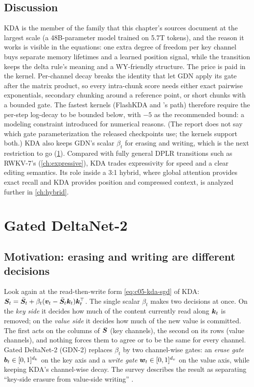 \subsection{Discussion}

KDA is the member of the family that this chapter's sources document at the largest scale (a
48B-parameter model trained on 5.7T tokens), and the reason it works is visible in the equations:
one extra degree of freedom per key channel buys separate
memory lifetimes and a learned position signal, while the transition keeps the delta rule's
meaning and a WY-friendly structure. The price is paid in the kernel. Per-channel decay breaks
the identity that let GDN apply its gate after the matrix product, so every intra-chunk score
needs either exact pairwise exponentials, secondary chunking around a reference point, or short
chunks with a bounded gate. The fastest kernels (FlashKDA and \fla{}'s  path)
therefore require the per-step log-decay to be bounded below, with $-5$ as the recommended bound:
a modeling constraint introduced for numerical reasons. (The report does not say which gate
parameterization the released checkpoints use; the kernels support both.) KDA also keeps GDN's scalar $\beta_t$
for erasing and writing, which is the next restriction to go (\cref{sec:c05-gdn2}). Compared with
fully general DPLR transitions such as RWKV-7's (\cref{ch:expressive}), KDA trades expressivity
for speed and a clear editing semantics. Its role inside a 3:1 hybrid, where global attention
provides exact recall and KDA provides position and compressed context, is analyzed further in
\cref{ch:hybrid}.

\section{Gated DeltaNet-2}\label{sec:c05-gdn2}

\subsection{Motivation: erasing and writing are different decisions}

Look again at the read-then-write form \cref{eq:c05-kda-sgd} of KDA:
$\bm{S}_t = \bar{\bm{S}}_t + \beta_t(\bm{v}_t - \bar{\bm{S}}_t\bm{k}_t)\bm{k}_t^{\top}$. The single scalar $\beta_t$ makes two
decisions at once. On the \emph{key side} it decides how much of the content currently read along
$\bm{k}_t$ is removed; on the \emph{value side} it decides how much of the new value is committed.
The first acts on the columns of $\bm{S}$ (key channels), the second on its rows (value channels),
and nothing forces them to agree or to be the same for every channel. Gated DeltaNet-2 (GDN-2)
\citep{hatamizadeh2026gdn2} replaces $\beta_t$ by two channel-wise gates: an \emph{erase gate}
$\bm{b}_t \in [0,1]^{d_k}$ on the key axis and a \emph{write gate} $\bm{w}_t \in [0,1]^{d_v}$ on the value
axis, while keeping KDA's channel-wise decay. The survey describes the result as separating
``key-side erasure from value-side writing'' \citep{zhoubian2026memory}.


